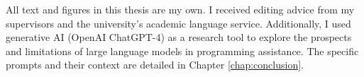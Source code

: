\documentclass[
11pt, %
english, %
singlespacing, %
headsepline, %
]{MastersDoctoralThesis} %
\begin{document}


\begin{acknowledgements}
\addchaptertocentry{\acknowledgementname} %
All text and figures in this thesis are my own. I received editing advice from my supervisors and the university's academic language service. Additionally, I used generative AI (OpenAI ChatGPT-4) as a research tool to explore the prospects and limitations of large language models in programming assistance. The specific prompts and their context are detailed in Chapter \ref{chap:conclusion}.

\end{acknowledgements}


\tableofcontents %

\listoffigures %




\end{document}
